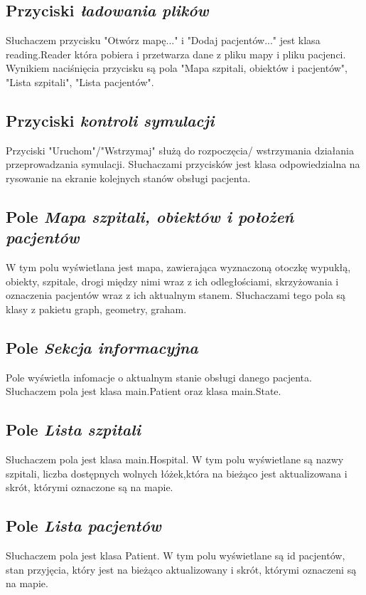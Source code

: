 \documentclass{article}
\begin{document}
\subsection{Przyciski \emph{ładowania plików}}
\label{gui_filebuttons}
Słuchaczem przycisku "Otwórz mapę..." i "Dodaj pacjentów..." jest klasa reading.Reader która pobiera i przetwarza dane z pliku mapy i pliku pacjenci. Wynikiem naciśnięcia przycisku są pola "Mapa szpitali, obiektów i pacjentów", "Lista szpitali", "Lista pacjentów".

\subsection{Przyciski \emph{kontroli symulacji}}
Przyciski "Uruchom"/"Wstrzymaj" służą do rozpoczęcia/ wstrzymania działania przeprowadzania symulacji. Słuchaczami przycisków jest klasa odpowiedzialna na rysowanie na ekranie kolejnych stanów obsługi pacjenta.

\subsection{Pole \emph{Mapa szpitali, obiektów i położeń pacjentów}}
\label{gui_map}
W tym polu wyświetlana jest mapa, zawierająca wyznaczoną otoczkę wypukłą, obiekty, szpitale, drogi między nimi wraz z ich odległościami, skrzyżowania i oznaczenia pacjentów wraz z ich aktualnym stanem. Słuchaczami tego pola są klasy z pakietu graph, geometry, graham.

\subsection{Pole \emph{Sekcja informacyjna}}
\label{gui_info}
Pole wyświetla infomacje o aktualnym stanie obsługi danego pacjenta. Słuchaczem pola jest klasa main.Patient oraz klasa main.State.

\subsection{Pole \emph{Lista szpitali}}
\label{gui_hospital}
Słuchaczem pola jest klasa main.Hospital. W tym polu wyświetlane są nazwy szpitali, liczba dostępnych wolnych łóżek,która na bieżąco jest aktualizowana i skrót, którymi oznaczone są na mapie.

\subsection{Pole \emph{Lista pacjentów}}
\label{gui_patients}
Słuchaczem pola jest klasa Patient. W tym polu wyświetlane są id pacjentów, stan przyjęcia, który jest na bieżąco aktualizowany i skrót, którymi oznaczeni są na mapie.
\end{document}
